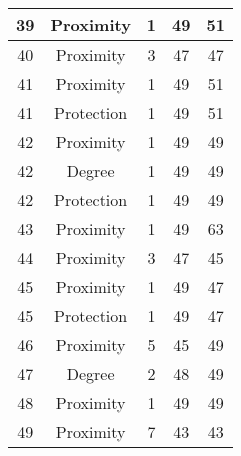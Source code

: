\documentclass[results.tex]{subfiles}
\begin{document}
\begin{center}
\begin{tabular}{| c || c | c | c | c |}
            \hline
            39                      & Proximity                    & 1                      & 49                      & 51                   \\
            \hline
            40                      & Proximity                    & 3                      & 47                      & 47                   \\
            \hline
            41                      & Proximity                    & 1                      & 49                      & 51                   \\
            \hline
            41                      & Protection                   & 1                      & 49                      & 51                   \\
            \hline
            42                      & Proximity                    & 1                      & 49                      & 49                   \\
            \hline
            42                      & Degree                       & 1                      & 49                      & 49                   \\
            \hline
            42                      & Protection                   & 1                      & 49                      & 49                   \\
            \hline
            43                      & Proximity                    & 1                      & 49                      & 63                   \\
            \hline
            44                      & Proximity                    & 3                      & 47                      & 45                   \\
            \hline
            45                      & Proximity                    & 1                      & 49                      & 47                   \\
            \hline
            45                      & Protection                   & 1                      & 49                      & 47                   \\
            \hline
            46                      & Proximity                    & 5                      & 45                      & 49                   \\
            \hline
            47                      & Degree                       & 2                      & 48                      & 49                   \\
            \hline
            48                      & Proximity                    & 1                      & 49                      & 49                   \\
            \hline
            49                      & Proximity                    & 7                      & 43                      & 43                   \\
            \hline
        \end{tabular}
    \end{center}
\end{document}
